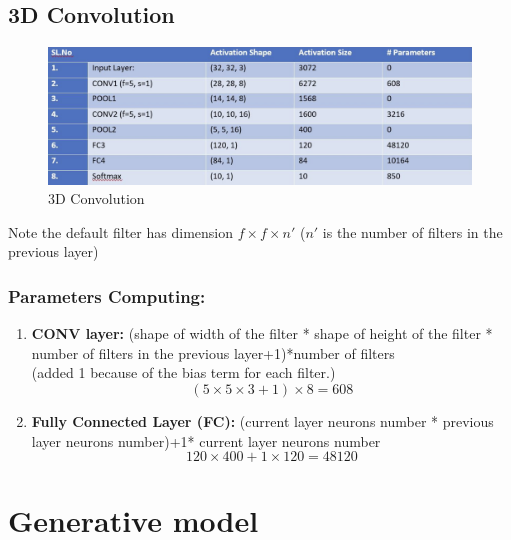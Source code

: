 \documentclass[11pt,a4paper]{article}
\begin{document}
\subsection{3D Convolution}
\begin{center}\begin{figure}[htbp]
    \centering
    \includegraphics[scale=0.2]{3DConv.png}
    \caption{3D Convolution}
    \label{}
\end{figure}\end{center}
Note the default filter has dimension $f\times f\times n'$ ($n'$ is the number of filters in the previous layer)
\subsubsection*{Parameters Computing:}
\begin{enumerate}
    \item \textbf{CONV layer:} (shape of width of the filter * shape of height of the filter * number of filters in the previous layer+1)*number of filters\\
    (added 1 because of the bias term for each filter.)
    $$(5\times 5\times 3+1)\times 8=608$$
    \item \textbf{Fully Connected Layer (FC):} (current layer neurons number * previous layer neurons number)+1* current layer neurons number
    $$120\times 400+ 1\times 120=48120$$
\end{enumerate}






\section{Generative model}
\end{document}
